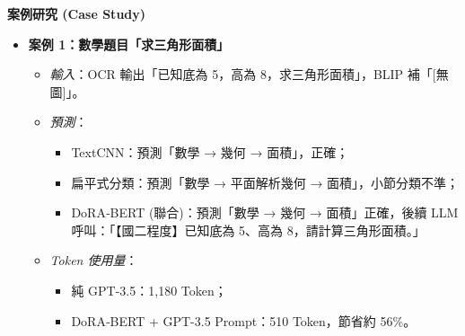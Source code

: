 \documentclass[10pt,conference]{IEEEtran}
\begin{document}
\begin{CJK}{UTF8}{bsmi}
\begin{table}[H]
  \centering
  \small
  \caption{各模型在測試集上的章節層級分類實驗成績}
  \label{tab:results}
\end{table}

\vspace{1ex}
\noindent\textbf{案例研究 (Case Study)}
\begin{itemize}
  \item \textbf{案例 1：數學題目「求三角形面積」}  
    \begin{itemize}
      \item \textit{輸入}：OCR 輸出「已知底為 5，高為 8，求三角形面積」，BLIP 補「[無圖]」。  
      \item \textit{預測}：  
        \begin{itemize}
          \item TextCNN：預測「數學 → 幾何 → 面積」，正確；  
          \item 扁平式分類：預測「數學 → 平面解析幾何 → 面積」，小節分類不準；  
          \item DoRA‐BERT (聯合)：預測「數學 → 幾何 → 面積」正確，後續 LLM 呼叫：「【國二程度】已知底為 5、高為 8，請計算三角形面積。」  
        \end{itemize}
      \item \textit{Token 使用量}：  
        \begin{itemize}
          \item 純 GPT-3.5：1,180 Token；  
          \item DoRA‐BERT + GPT-3.5 Prompt：510 Token，節省約 56\%。  
        \end{itemize}
    \end{itemize}


\end{itemize}
\end{CJK}
\end{document}
